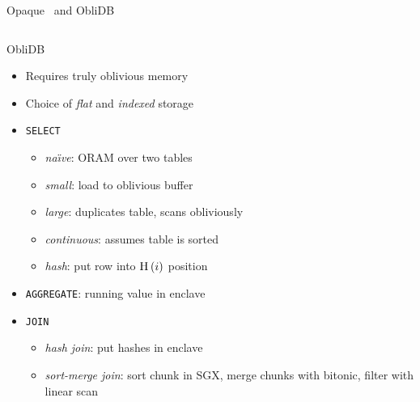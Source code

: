 \begin{frame}{Opaque~\cite{opaque} and ObliDB~\cite{oblidb}}
\begin{columns}[T,onlytextwidth]
{\begin{block}{ObliDB~\cite{oblidb}}
							\begin{itemize}
								\item \alert{Requires truly oblivious memory}
								\item Choice of \emph{flat} and \emph{indexed} storage
								\item \texttt{SELECT}
									\begin{itemize}
										\item \emph{na\"\i{}ve}: ORAM over two tables
										\item \emph{small}: load to oblivious buffer
										\item \emph{large}: duplicates table, scans obliviously
										\item \emph{continuous}: assumes table is sorted
										\item \emph{hash}: put row into $\algo{H}{i}$ position
									\end{itemize}
								\item \texttt{AGGREGATE}: running value in enclave
								\item \texttt{JOIN}
									\begin{itemize}
										\item \emph{hash join}: put hashes in enclave
										\item \emph{sort-merge join}: sort chunk in SGX, merge chunks with bitonic, filter with linear scan
									\end{itemize}
							\end{itemize}

						\end{block}

					}

			\end{columns}

		\end{frame}

